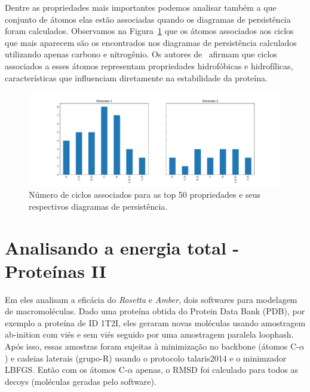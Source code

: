 Dentre as propriedades mais importantes podemos analisar também a que conjunto de átomos elas estão 
associadas quando os diagramas de persistência foram calculados. Observamos na Figura~\ref{fig:plt_dim}
que os átomos associados aos ciclos que mais aparecem são os encontrados nos diagramas de persistência
calculados utilizando apenas carbono e nitrogênio. Os autores de~\cite{Cang2018} afirmam que 
ciclos associados a esses átomos representam propriedades hidrofóbicas e hidrofílicas, 
características que influenciam diretamente na estabilidade da proteína.  

\begin{figure}[htpb!]
    \centering
    \includegraphics[width=0.99\textwidth]{images/plt_dim.pdf}
    \caption{Número de ciclos associados para as top 50 propriedades e seus respectivos 
        diagramas de persistência.}
    \label{fig:plt_dim}
    \fautor
\end{figure}

\section{Analisando a energia total - Proteínas II}\label{sec:predrmsd}

Em \cite{Rubenstein2018} eles analisam a eficácia do \textit{Rosetta} e \textit{Amber}, dois softwares
para modelagem de macromoléculas. Dado uma proteína obtida do Protein Data Bank (PDB), por exemplo a proteína
de ID 1T2I, eles geraram novas moléculas usando amostragem ab-inition com viés e sem viés seguido por
uma amostragem paralela loophash. Após isso, essas amostras foram sujeitas à minimização no
backbone (átomos C-$\alpha$) e cadeias laterais (grupo-R) usando o protocolo talaris2014 e o minimzador
LBFGS. Então com os átomos C-$\alpha$ apenas, o RMSD foi calculado para todos as decoys (moléculas
geradas pelo software).

